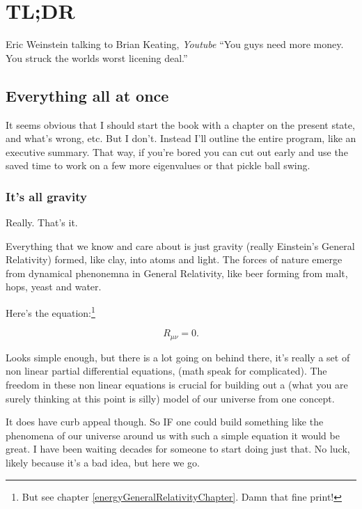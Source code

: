 \documentclass[../rzero]{subfiles}
\begin{document}
\chapter{TL;DR}\label{introChapter}

\begin{chapquote}{Eric Weinstein talking to Brian Keating, \textit{Youtube\cite{drbriankeatingEricWeinsteinTheoretical2020}}}
``You guys need more money. You struck the worlds worst licening deal.''
\end{chapquote}


\section{Everything all at once}
It seems obvious that I should start the book with a chapter on the present state, and what's wrong, etc. But I don't. Instead I'll outline the entire program, like an executive summary. That way, if you're bored you can cut out early and use the saved time to work on a few more eigenvalues or that pickle ball swing. 

\subsection{It's all gravity}
	Really. That's it. 
	
	Everything that we know and care about is just gravity (really Einstein's General Relativity) formed, like clay, into atoms and light. The forces of nature emerge from dynamical phenonemna in General Relativity, like beer forming from malt, hops, yeast and water. 
	
	Here's the equation:\footnote{But see chapter \ref{energyGeneralRelativityChapter}. Damn that fine print!} 
	

\begin{equation}\label{vacuumEquation} 
R_{\mu\nu} = 0 .  
\end{equation}

Looks simple enough, but there is a lot going on behind there, it's really a set of non linear partial differential equations, (math speak for complicated). The freedom in these non linear equations is crucial for building out a (what you are surely thinking at this point is silly) model of our universe from one concept. 

It does have curb appeal though. So IF one could build something like the phenomena of our universe around us with such a simple equation it would be great. I have been waiting decades for someone to start doing just that. No luck, likely because it's a bad idea, but here we go. 
\end{document}
